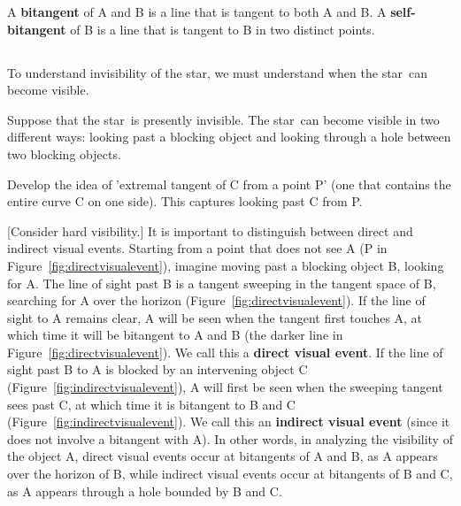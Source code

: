 \documentclass[12pt]{article}
\newcommand{\hero}{star}
\begin{document}

\begin{defn2}
A {\bf bitangent} of A and B is a line that is tangent to both A and B.
A {\bf self-bitangent} of B is a line that is tangent to B in two distinct points.
\end{defn2}

\subsection{}

To understand invisibility of the \hero, 
we must understand when the \hero\ can become visible.

Suppose that the \hero\ is presently invisible.
The \hero\ can become visible in two different ways: looking past a blocking object
and looking through a hole between two blocking objects.

Develop the idea of 'extremal tangent of C from a point P' (one that contains the entire
curve C on one side).
This captures looking past C from P.

[Consider hard visibility.]
It is important to distinguish between direct and indirect visual events.
Starting from a point that does not see A (P in Figure~\ref{fig:directvisualevent}),
imagine moving past a blocking object B, looking for A.
The line of sight past B is a tangent sweeping in the
tangent space of B, searching for A over the horizon
(Figure~\ref{fig:directvisualevent}).
If the line of sight to A remains clear, 
A will be seen %
when the tangent first touches A,
at which time it will be bitangent to A and B
(the darker line in Figure~\ref{fig:directvisualevent}).
We call this a {\bf direct visual event}.
If the line of sight past B to A is blocked by an intervening object C
(Figure~\ref{fig:indirectvisualevent}),
A will first be seen when the sweeping tangent sees past C, at which time
it is bitangent to B and C (Figure~\ref{fig:indirectvisualevent}).
We call this an {\bf indirect visual event}
(since it does not involve a bitangent with A).
In other words, in analyzing the visibility of the object A,
direct visual events occur at bitangents of A and B,
as A appears over the horizon of B,
while indirect visual events occur at bitangents of B and C,
as A appears through a hole bounded by B and C.
\end{document}
